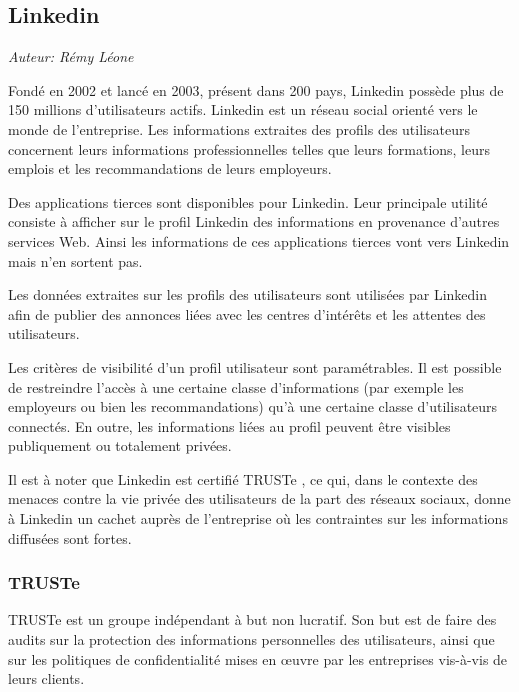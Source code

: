\subsection{Linkedin}

\begin{flushright}\textit{Auteur: Rémy Léone}\end{flushright}

Fondé en 2002 et lancé en 2003, présent dans 200 pays, Linkedin possède plus de
150 millions d'utilisateurs actifs. \cite{linkedin-stats} Linkedin est un réseau
social orienté vers le monde de l'entreprise. Les informations extraites des
profils des utilisateurs concernent leurs informations professionnelles telles
que leurs formations, leurs emplois et les recommandations de leurs employeurs.


Des applications tierces sont disponibles pour Linkedin. Leur principale
utilité consiste à afficher sur le profil Linkedin des informations en
provenance d'autres services Web. Ainsi les informations de ces applications
tierces vont vers Linkedin mais n'en sortent pas.


Les données extraites sur les profils des utilisateurs sont utilisées par
Linkedin afin de publier des annonces liées avec les centres d'intérêts et les
attentes des utilisateurs.


Les critères de visibilité d'un profil utilisateur sont paramétrables. Il est
possible de restreindre l'accès à une certaine classe d'informations (par
exemple les employeurs ou bien les recommandations) qu'à une certaine classe
d'utilisateurs connectés. En outre, les informations liées au profil peuvent
être visibles publiquement ou totalement privées.

Il est à noter que Linkedin est certifié TRUSTe \cite{truste}, ce qui, dans
le contexte des menaces contre la vie privée des utilisateurs de la part des
réseaux sociaux, donne à Linkedin un cachet auprès de l'entreprise où les
contraintes sur les informations diffusées sont fortes.

\subsubsection{TRUSTe}

TRUSTe est un groupe indépendant à but non lucratif. \cite{truste} Son but est
de faire des audits sur la protection des informations personnelles des
utilisateurs, ainsi que sur les politiques de confidentialité mises en œuvre
par les entreprises vis-à-vis de leurs clients.

